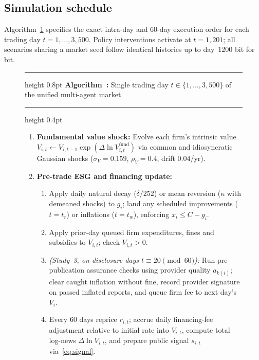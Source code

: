 \documentclass[11pt]{article}
\newcounter{algo}
\begin{document}
\subsection{Simulation schedule}\label{sec:schedule}

Algorithm~\ref{alg:step} specifies the exact intra-day and 60-day execution order for each trading day $t = 1,\dots,3{,}500$. Policy interventions activate at $t = 1{,}201$; all scenarios sharing a market seed follow identical histories up to day~1200 bit for bit.

\begin{figure}[t]
\centering
\small
\begin{minipage}{0.96\textwidth}
\hrule height 0.8pt
\vspace{3pt}
\noindent{}\label{alg:step}\textbf{Algorithm~\thealgo:} Single trading day $t \in \{1,\dots,3{,}500\}$ of the unified multi-agent market
\vspace{2pt}
\hrule height 0.4pt
\vspace{4pt}
\begin{enumerate}[leftmargin=1.8em, itemsep=2pt, topsep=0pt]
\item \textbf{Fundamental value shock:} Evolve each firm's intrinsic value $V_{i,t} \leftarrow V_{i,t-1}\exp(\Delta\ln V^{\text{fund}}_{i,t})$ via common and idiosyncratic Gaussian shocks ($\sigma_V = 0.159$, $\rho_V = 0.4$, drift $0.04$/yr).
\item \textbf{Pre-trade ESG and financing update:}
  \begin{enumerate}[label=(\alph*), leftmargin=1.5em, itemsep=1pt, topsep=1pt]
  \item Apply daily natural decay ($\delta/252$) or mean reversion ($\kappa$ with demeaned shocks) to $g_i$; land any scheduled improvements ($t = t_r$) or inflations ($t = t_w$), enforcing $x_i \le C - g_i$.
  \item Apply prior-day queued firm expenditures, fines and subsidies to $V_{i,t}$; check $V_{i,t} > 0$.
  \item \emph{(Study~3, on disclosure days $t \equiv 20 \pmod{60}$):} Run pre-publication assurance checks using provider quality $a_{k(i)}$; clear caught inflation without fine, record provider signature on passed inflated reports, and queue firm fee to next day's $V_i$.
  \item Every 60 days reprice $r_{i,t}$; accrue daily financing-fee adjustment relative to initial rate into $V_{i,t}$, compute total log-news $\Delta\ln V_{i,t}$, and prepare public signal $s_{i,t}$ via~\eqref{eq:signal}.

\end{enumerate}
\end{enumerate}
\end{minipage}
\end{figure}
\end{document}
